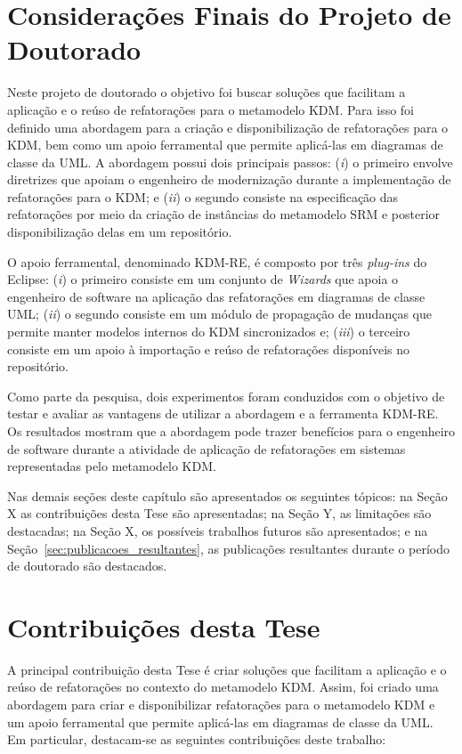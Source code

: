 \section{Considerações Finais do Projeto de Doutorado}

Neste projeto de doutorado o objetivo foi buscar soluções que facilitam a aplicação e o reúso de refatorações para o metamodelo KDM. Para isso foi definido uma abordagem para a criação e disponibilização de refatorações para o KDM, bem como um apoio ferramental que permite aplicá-las em diagramas de classe da UML. A abordagem possui dois principais passos: (\textit{i}) o primeiro envolve diretrizes que apoiam o engenheiro de modernização durante a implementação de refatorações para o KDM; e (\textit{ii}) o segundo consiste na especificação das refatorações por meio da criação de instâncias do metamodelo SRM e posterior disponibilização delas em um repositório.

O apoio ferramental, denominado KDM-RE, é composto por três \textit{plug-ins} do Eclipse: (\textit{i}) o primeiro consiste em um conjunto de \textit{Wizards} que apoia o engenheiro de software na aplicação das refatorações em diagramas de classe UML; (\textit{ii}) o segundo consiste em um módulo de propagação de mudanças que permite manter modelos internos do KDM sincronizados e; (\textit{iii}) o terceiro consiste em um apoio à importação e reúso de refatorações disponíveis no repositório.

Como parte da pesquisa, dois experimentos foram conduzidos com o objetivo de testar e avaliar as vantagens de utilizar a abordagem e a ferramenta KDM-RE. Os resultados mostram que a abordagem pode trazer benefícios para o engenheiro de software durante a atividade de aplicação de refatorações em sistemas representadas pelo metamodelo KDM.

Nas demais seções deste capítulo são apresentados os seguintes tópicos: na Seção X as contribuições desta Tese são apresentadas; na Seção Y, as limitações são destacadas; na Seção X, os possíveis trabalhos futuros são apresentados; e na Seção~\ref{sec:publicacoes_resultantes}, as publicações resultantes durante o período de doutorado são destacados. 

\section{Contribuições desta Tese}\label{sec:contribuicoes_desta_tese}

A principal contribuição desta Tese é criar soluções que facilitam a aplicação e o reúso de refatorações no contexto do metamodelo KDM. Assim, foi criado uma abordagem para criar e disponibilizar refatorações para o metamodelo KDM e um apoio ferramental que permite aplicá-las em diagramas de classe da UML. %
%
Em particular, destacam-se as seguintes contribuições deste trabalho:

